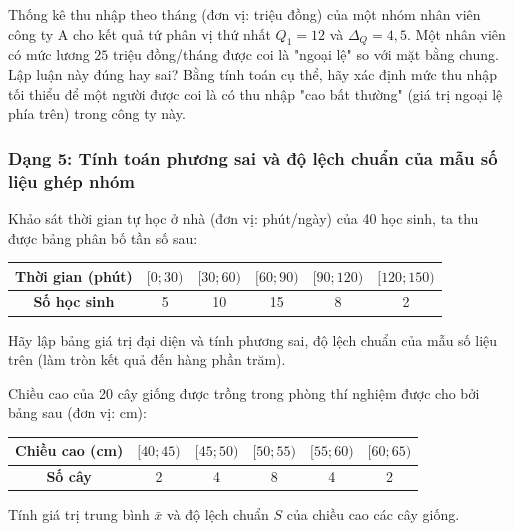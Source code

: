 \documentclass[12pt]{article}
\begin{document}
	\begin{btdo}[title={Bài 6}]
		Thống kê thu nhập theo tháng (đơn vị: triệu đồng) của một nhóm nhân viên công ty A cho kết quả tứ phân vị thứ nhất $Q_1 = 12$ và $\Delta_Q = 4,5$. Một nhân viên có mức lương $25$ triệu đồng/tháng được coi là "ngoại lệ" so với mặt bằng chung. Lập luận này đúng hay sai? Bằng tính toán cụ thể, hãy xác định mức thu nhập tối thiểu để một người được coi là có thu nhập "cao bất thường" (giá trị ngoại lệ phía trên) trong công ty này.
	\end{btdo}
	
	\subsubsection{Dạng 5: Tính toán phương sai và độ lệch chuẩn của mẫu số liệu ghép nhóm}
	
	\begin{btxanh}[title={Bài 1}]
		Khảo sát thời gian tự học ở nhà (đơn vị: phút/ngày) của 40 học sinh, ta thu được bảng phân bố tần số sau:
		\begin{center}
			\renewcommand{\arraystretch}{1.3}
			\begin{tabular}{|c|c|c|c|c|c|}
				\hline
				\textbf{Thời gian (phút)} & $[0; 30)$ & $[30; 60)$ & $[60; 90)$ & $[90; 120)$ & $[120; 150)$ \\
				\hline
				\textbf{Số học sinh} & 5 & 10 & 15 & 8 & 2 \\
				\hline
			\end{tabular}
		\end{center}
		Hãy lập bảng giá trị đại diện và tính phương sai, độ lệch chuẩn của mẫu số liệu trên (làm tròn kết quả đến hàng phần trăm).
	\end{btxanh}
	
	\begin{btxanh}[title={Bài 2}]
		Chiều cao của 20 cây giống được trồng trong phòng thí nghiệm được cho bởi bảng sau (đơn vị: cm):
		\begin{center}
			\renewcommand{\arraystretch}{1.3}
			\begin{tabular}{|c|c|c|c|c|c|}
				\hline
				\textbf{Chiều cao (cm)} & $[40; 45)$ & $[45; 50)$ & $[50; 55)$ & $[55; 60)$ & $[60; 65)$ \\
				\hline
				\textbf{Số cây} & 2 & 4 & 8 & 4 & 2 \\
				\hline
			\end{tabular}
		\end{center}
		Tính giá trị trung bình $\bar{x}$ và độ lệch chuẩn $S$ của chiều cao các cây giống.
	\end{btxanh}
	
\end{document}
